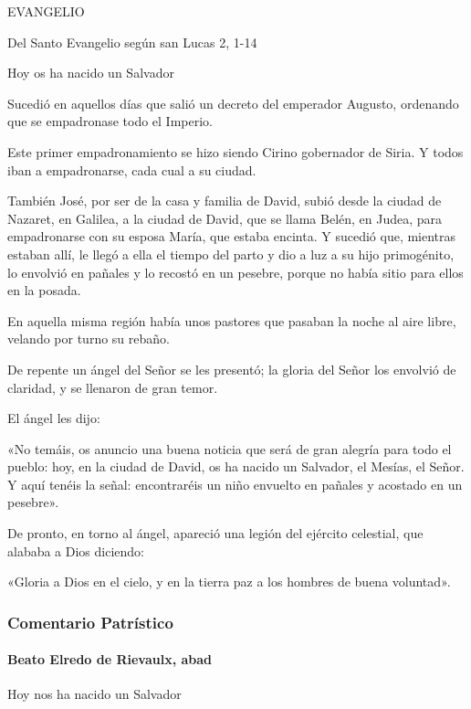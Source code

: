 \documentclass[]{article}
\let\oldparagraph\paragraph
\renewcommand{\paragraph}[1]{\oldparagraph{#1}\mbox{}}
\begin{document}
EVANGELIO

Del Santo Evangelio según san Lucas 2, 1-14

Hoy os ha nacido un Salvador

Sucedió en aquellos días que salió un decreto del emperador Augusto,
ordenando que se empadronase todo el Imperio.

Este primer empadronamiento se hizo siendo Cirino gobernador de Siria. Y
todos iban a empadronarse, cada cual a su ciudad.

También José, por ser de la casa y familia de David, subió desde la
ciudad de Nazaret, en Galilea, a la ciudad de David, que se llama Belén,
en Judea, para empadronarse con su esposa María, que estaba encinta. Y
sucedió que, mientras estaban allí, le llegó a ella el tiempo del parto
y dio a luz a su hijo primogénito, lo envolvió en pañales y lo recostó
en un pesebre, porque no había sitio para ellos en la posada.

En aquella misma región había unos pastores que pasaban la noche al aire
libre, velando por turno su rebaño.

De repente un ángel del Señor se les presentó; la gloria del Señor los
envolvió de claridad, y se llenaron de gran temor.

El ángel les dijo:

«No temáis, os anuncio una buena noticia que será de gran alegría para
todo el pueblo: hoy, en la ciudad de David, os ha nacido un Salvador, el
Mesías, el Señor. Y aquí tenéis la señal: encontraréis un niño envuelto
en pañales y acostado en un pesebre».

De pronto, en torno al ángel, apareció una legión del ejército
celestial, que alababa a Dios diciendo:

«Gloria a Dios en el cielo, y en la tierra paz a los hombres de buena
voluntad».


\protect\hypertarget{_Toc448662779}{}{}

\subsubsection{Comentario Patrístico}\label{comentario-patruxedstico-5}

\paragraph{Beato Elredo de Rievaulx,
abad}\label{beato-elredo-de-rievaulx-abad}

Hoy nos ha nacido un Salvador
\end{document}
